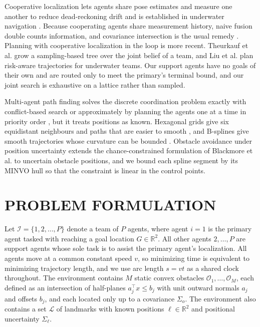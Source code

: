 \documentclass[letterpaper, 10 pt, conference]{ieeeconf}
\theoremstyle{remark}
\begin{document}
Cooperative localization lets agents share pose estimates and measure one
another to reduce dead-reckoning drift \cite{roumeliotis2002dist,bahr2009coop}
and is established in underwater navigation \cite{paull2014auv}. Because cooperating agents share
measurement history, naive fusion double counts information, and covariance
intersection \cite{julier1997cov} is the usual remedy \cite{carrillo2013ci}.
Planning with cooperative localization in the loop is more recent. Theurkauf
et al. \cite{theurkauf2025coop} grow a sampling-based tree over the joint
belief of a team, and Liu et al. \cite{liu2026risk} plan risk-aware
trajectories for underwater teams. Our support agents have no goals of their
own and are routed only to meet the primary's terminal bound, and our joint
search is exhaustive on a lattice rather than sampled.

Multi-agent path finding solves the discrete coordination problem exactly
with conflict-based search \cite{sharon2015cbs} or approximately by planning
the agents one at a time in priority order
\cite{erdmann1987multiple,silver2005cooperative}, but it treats positions as
known. Hexagonal grids give six equidistant neighbours and paths that are
easier to smooth \cite{duszak2021hexgrid}, and B-splines give smooth
trajectories whose curvature can be bounded \cite{feng2024bsrrt}. Obstacle
avoidance under position uncertainty extends the chance-constrained
formulation of Blackmore et al. \cite{blackmore2011chance} to uncertain
obstacle positions, and we bound each spline segment by its MINVO hull
\cite{tordesillas2022minvo} so that the constraint is linear in the control
points.

\section{PROBLEM FORMULATION}
\label{sec:pf}
Let $\mathcal{I} = \{1,2,\dots,P\}$ denote a team of $P$ agents, where agent $i=1$
is the primary agent tasked with reaching a goal location $G\in\mathbb{R}^2$.
All other agents $2,\dots,P$ are support agents whose sole task is to assist the
primary agent's localization. All agents move at a common constant speed $v$,
so minimizing time is equivalent to minimizing trajectory length, and we use
arc length $s = vt$ as a shared clock throughout. The environment contains $M$
static convex obstacles $\mathcal{O}_1,\dots,\mathcal{O}_M$, each defined as an
intersection of half-planes $a_j^{\top}x \le b_j$ with unit outward normals
$a_j$ and offsets $b_j$, and each located only up to a covariance $\Sigma_o$.
The environment also contains a set $\mathcal{L}$ of landmarks with known
positions $\ell\in\mathbb{R}^2$ and positional uncertainty $\Sigma_\ell$.
\end{document}
